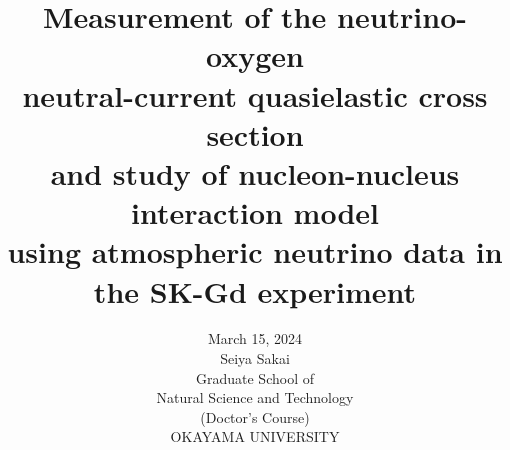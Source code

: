 \documentclass[11pt, twoside, titlepage]{article}
\title{
\fontsize{17.28pt}{34.56pt}
\textbf{Measurement of the neutrino-oxygen}\\
\textbf{neutral-current quasielastic cross section}\\
\textbf{and study of nucleon-nucleus interaction model}\\
\textbf{using atmospheric neutrino data in the SK-Gd experiment}
\vspace{10mm}
}
\author{
{\LARGE March 15, 2024}                \vspace{3mm}\\
{\LARGE Seiya Sakai}                   \vspace{20mm}\\
{\LARGE Graduate School of}            \vspace{3mm}\\
{\LARGE Natural Science and Technology}\vspace{3mm}\\
{\LARGE (Doctor's Course)}             \vspace{3mm}\\
{\LARGE OKAYAMA UNIVERSITY}
}
\date{}
\def\theequation{\thesection.\arabic{equation}}
\def\thefigure{\thesection.\arabic{figure}}
\def\thetable{\thesection.\arabic{table}}
\newcommand{\Noheaderfooter}{
\lhead[{\bf \thepage}]{}
\rhead[]{{\bf \thepage}}
\cfoot[]{}
}
\begin{document}
\parindent=0pt

\maketitle






\setcounter{tocdepth}{3}
\Noheaderfooter
\tableofcontents
\newpage
\listoffigures
\newpage
\listoftables
\cleardoublepage











\renewcommand{\theequation}{\Alph{section}.\arabic{equation}}
\renewcommand{\thefigure}{\Alph{section}.\arabic{figure}}
\renewcommand{\thetable}{\Alph{section}.\arabic{table}}

\appendix



\Noheaderfooter
%


\newpage
\end{document}
